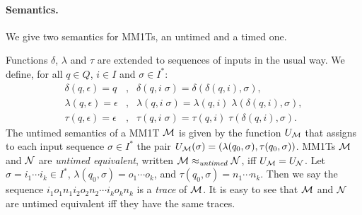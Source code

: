 \paragraph{Semantics.}
We give two semantics for MM1Ts, an untimed and a timed one.

Functions $\delta$, $\lambda$ and $\tau$ are extended to sequences of inputs in the usual way.
We define, for all $q \in Q$, $i \in I$ and $\sigma \in I^{\ast}$:
\begin{eqnarray*}
\delta(q, \epsilon) = q & , & \delta (q, i \; \sigma) = \delta(\delta(q,i), \sigma),\\
\lambda(q, \epsilon) = \epsilon & ,& \lambda(q, i \;\sigma) = \lambda(q,i) \; \lambda(\delta(q,i),\sigma),\\
\tau(q, \epsilon) = \epsilon &, & \tau(q, i \;\sigma) = \tau(q,i) \; \tau(\delta(q,i),\sigma).
\end{eqnarray*}
The untimed semantics of a MM1T ${\cal M}$ is given by the function $U_{{\cal M}}$ that assigns to each input sequence $\sigma \in I^{\ast}$
the pair $U_{{\cal M}}(\sigma) = (\lambda(q_0, \sigma), \tau(q_0, \sigma))$.
MM1Ts ${\cal M}$ and ${\cal N}$ are \emph{untimed equivalent}, written ${\cal M} \approx_{\mathit{untimed}} {\cal N}$, iff $U_{{\cal M}} = U_{{\cal N}}$.
%
Let $\sigma = i_1 \cdots i_k \in I^{\ast}$,
$\lambda(q_0, \sigma) = o_1 \cdots o_k$, and
$\tau(q_0, \sigma) = n_1 \cdots n_k$.
Then we say the sequence $i_1 o_1 n_1 i_2 o_2 n_2 \cdots i_k o_k n_k$ is a \emph{trace} of ${\cal M}$.
It is easy to see that ${\cal M}$ and ${\cal N}$ are untimed equivalent iff they have the same traces.

